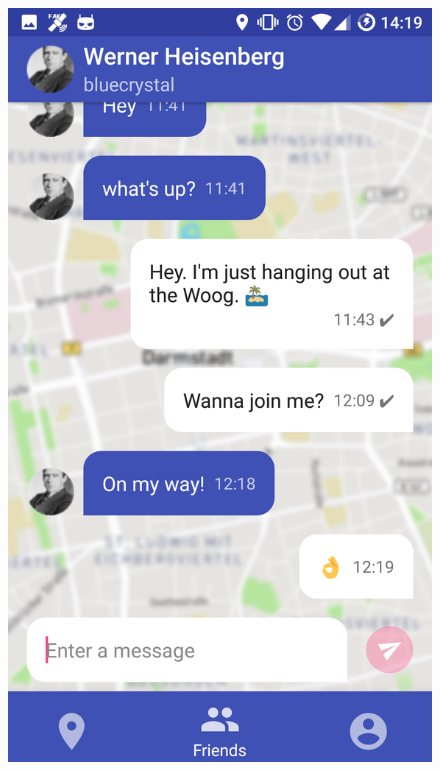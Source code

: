 \documentclass[11pt, accentcolor=tud1c]{tudreport}
\begin{document}
\begin{figure}[h]
\begin{minipage}{.3\textwidth}
  \includegraphics[width=.8\linewidth]{./res/chat.png}
  \label{fig:live_chat}
\end{minipage}%
\end{figure}
\end{document}
